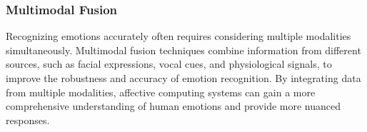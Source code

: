 \subsubsection{Multimodal Fusion}
Recognizing emotions accurately often requires considering multiple modalities simultaneously. 
Multimodal fusion techniques combine information from different sources, such as facial expressions, vocal cues, and physiological signals,
to improve the robustness and accuracy of emotion recognition.
By integrating data from multiple modalities, affective computing systems can gain a more comprehensive understanding of human emotions and provide more nuanced responses.
